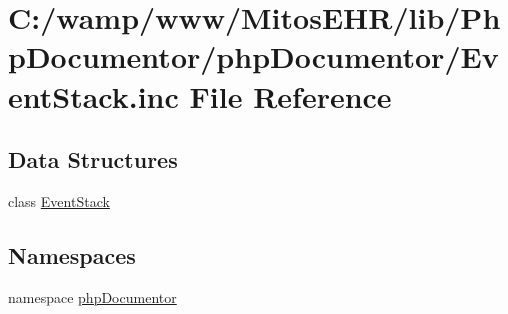 \hypertarget{_event_stack_8inc}{\section{\-C\-:/wamp/www/\-Mitos\-E\-H\-R/lib/\-Php\-Documentor/php\-Documentor/\-Event\-Stack.inc \-File \-Reference}
\label{_event_stack_8inc}
}
\subsection*{\-Data \-Structures}
\begin{DoxyCompactItemize}
\item 
class \hyperlink{class_event_stack}{\-Event\-Stack}
\end{DoxyCompactItemize}
\subsection*{\-Namespaces}
\begin{DoxyCompactItemize}
\item 
namespace \hyperlink{namespacephp_documentor}{php\-Documentor}
\end{DoxyCompactItemize}

